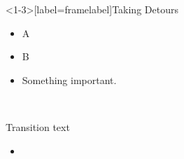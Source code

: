 \documentclass{beamer}
\begin{document}
\begin{frame}<1-3>[label=framelabel]{Taking Detours}
  \begin{itemize}
  \item A
    \pause
  \item B
    \pause
  \item\alert<4->{Something important.
  }
  \end{itemize}
\end{frame}

\

\begin{frame}
  Transition text
  \begin{itemize}
  \item {}
  \end{itemize}
\end{frame}

\end{document}
